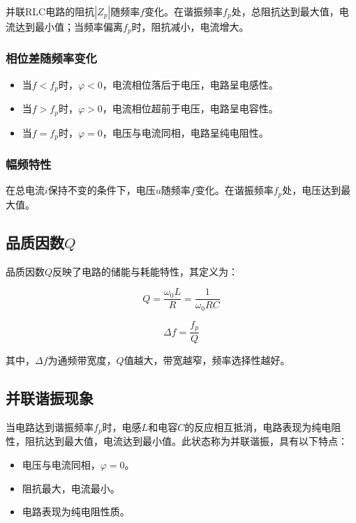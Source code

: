 \documentclass[a4paper,10pt]{article}
\begin{document}
并联RLC电路的阻抗\( |Z_p| \)随频率\( f \)变化。在谐振频率\( f_p \)处，总阻抗达到最大值，电流达到最小值；当频率偏离\( f_p \)时，阻抗减小，电流增大。

\subsubsection{相位差随频率变化}

\begin{itemize}
    \item 当\( f < f_p \)时，\( \varphi < 0 \)，电流相位落后于电压，电路呈电感性。
    \item 当\( f > f_p \)时，\( \varphi > 0 \)，电流相位超前于电压，电路呈电容性。
    \item 当\( f = f_p \)时，\( \varphi = 0 \)，电压与电流同相，电路呈纯电阻性。
\end{itemize}

\subsubsection{幅频特性}

在总电流\( i \)保持不变的条件下，电压\( u \)随频率\( f \)变化。在谐振频率\( f_p \)处，电压达到最大值。

\subsection{品质因数\( Q \) }

品质因数\( Q \)反映了电路的储能与耗能特性，其定义为：

\begin{equation}
Q = \frac{\omega_0 L}{R} = \frac{1}{\omega_0 R C}
\end{equation}

\begin{equation}
\Delta f = \frac{f_p}{Q}
\end{equation}

其中，\( \Delta f \)为通频带宽度，\( Q \)值越大，带宽越窄，频率选择性越好。

\subsection{并联谐振现象}

当电路达到谐振频率\( f_p \)时，电感\( L \)和电容\( C \)的反应相互抵消，电路表现为纯电阻性，阻抗达到最大值，电流达到最小值。此状态称为并联谐振，具有以下特点：
\begin{itemize}
    \item 电压与电流同相，\( \varphi = 0 \)。
    \item 阻抗最大，电流最小。
    \item 电路表现为纯电阻性质。
\end{itemize}
\end{document}
